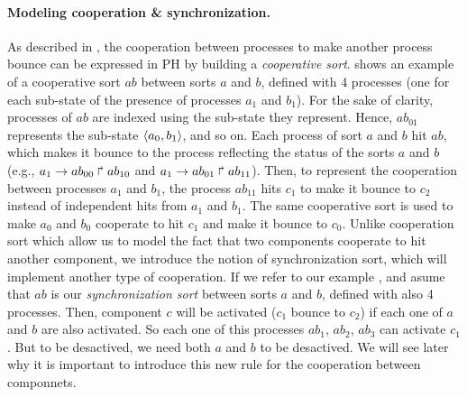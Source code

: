 \paragraph{Modeling cooperation \& synchronization.}

As described in \cite{PMR10-TCSB}, the cooperation between processes to make another process bounce can be
expressed in PH by building a \emph{cooperative sort}.
 shows an example of a cooperative sort $ab$ between sorts $a$ and $b$,
defined with 4 processes (one for each sub-state of the presence of processes $a_1$ and $b_1$).
For the sake of clarity, processes of $ab$ are indexed using the sub-state they represent.
Hence, $ab_{01}$ represents the sub-state $\langle a_0,b_1 \rangle$, and so on.
Each process of sort $a$ and $b$ hit $ab$, which makes it bounce to the process reflecting the status of the sorts $a$
and $b$ (e.g., $a_1\rightarrow ab_{00}\Rsh ab_{10}$ and $a_1\rightarrow ab_{01}\Rsh ab_{11}$).
Then, to represent the cooperation between processes $a_1$ and $b_1$,
the process $ab_{11}$ hits $c_1$ to make it bounce to $c_2$ instead of
independent hits from $a_1$ and $b_1$.
The same cooperative sort is used to make $a_0$ and $b_0$ cooperate to hit $c_1$ and make it bounce to $c_0$.
Unlike cooperation sort which allow us to model the fact that two components cooperate to hit another component, we introduce
the notion of synchronization sort, which will implement another type of cooperation. If we refer to our example
, and asume that $ab$ is our \emph{synchronization sort} between sorts $a$ and $b$, defined with also 
4 processes. Then, component $c$ will be activated ($c_1$ bounce to $c_2$) if each one of $a$ and $b$ are also activated. So each 
one of this processes $ab_1$, $ab_2$, $ab_3$ can activate $c_1$. But to be desactived, we need both $a$ and $b$ to be desactived.
We will see later why it is important to introduce this new rule for the cooperation between componnets.

